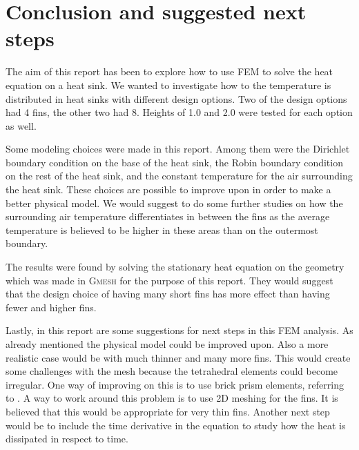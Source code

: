 \section{Conclusion and suggested next steps}
The aim of this report has been to explore how to use FEM to solve the heat equation on a heat sink. We wanted to investigate how to the temperature is distributed in heat sinks with different design options. Two of the design options had 4 fins, the other two had 8. Heights of 1.0 and 2.0 were tested for each option as well.

Some modeling choices were made in this report. Among them were the Dirichlet boundary condition on the base of the heat sink, the Robin boundary condition on the rest of the heat sink, and the constant temperature for the air surrounding the heat sink. These choices are possible to improve upon in order to make a better physical model. We would suggest to do some further studies on how the surrounding air temperature differentiates in between the fins as the average temperature is believed to be higher in these areas than on the outermost boundary. 

The results were found by solving the stationary heat equation on the geometry which was made in \textsc{Gmesh}\xspace for the purpose of this report. They would suggest that the design choice of having many short fins has more effect than having fewer and higher fins.

Lastly, in this report are some suggestions for next steps in this FEM analysis. As already mentioned the physical model could be improved upon. Also a more realistic case would be with much thinner and many more fins. This would create some challenges with the mesh because the tetrahedral elements could become irregular. One way of improving on this is to use brick prism elements, referring to \cite{comsol_mesh_types}. A way to work around this problem is to use 2D meshing for the fins. It is believed that this would be appropriate for very thin fins. Another next step would be to include the time derivative in the equation to study how the heat is dissipated in respect to time.